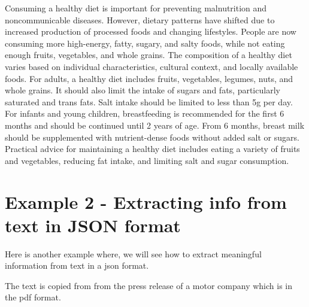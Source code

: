 \documentclass[
  letterpaper,
  DIV=11,
  numbers=noendperiod]{scrreprt}
\begin{document}
Consuming a healthy diet is important for preventing malnutrition and
noncommunicable diseases. However, dietary patterns have shifted due to
increased production of processed foods and changing lifestyles. People
are now consuming more high-energy, fatty, sugary, and salty foods,
while not eating enough fruits, vegetables, and whole grains. The
composition of a healthy diet varies based on individual
characteristics, cultural context, and locally available foods. For
adults, a healthy diet includes fruits, vegetables, legumes, nuts, and
whole grains. It should also limit the intake of sugars and fats,
particularly saturated and trans fats. Salt intake should be limited to
less than 5g per day. For infants and young children, breastfeeding is
recommended for the first 6 months and should be continued until 2 years
of age. From 6 months, breast milk should be supplemented with
nutrient-dense foods without added salt or sugars. Practical advice for
maintaining a healthy diet includes eating a variety of fruits and
vegetables, reducing fat intake, and limiting salt and sugar
consumption.

\hypertarget{example-2---extracting-info-from-text-in-json-format}{%
\section{Example 2 - Extracting info from text in JSON
format}\label{example-2---extracting-info-from-text-in-json-format}}

Here is another example where, we will see how to extract meaningful
information from text in a json format.

The text is copied from from the press release of a motor company which
is in the pdf format.
\end{document}
